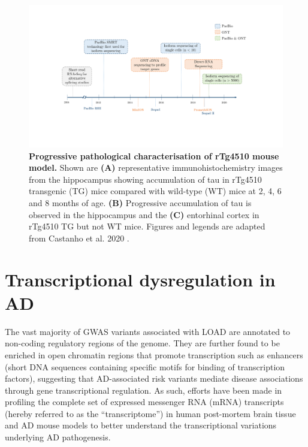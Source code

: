 \begin{landscape}
	\begin{figure}[htp]
		\centering
		\vspace{20pt}
		\includegraphics[page=3,trim={0 7cm 0 0 },clip, scale = 0.7]{Figures/Introduction_Figures_Landscape.pdf}
		\captionsetup{width=1.5\textwidth}
		\caption[Progressive pathological characterisation of rTg4510 mouse model]%
		{\textbf{Progressive pathological characterisation of rTg4510 mouse model.} Shown are \textbf{(A)} representative immunohistochemistry images from the hippocampus showing accumulation of tau in rTg4510 transgenic (TG) mice compared with wild-type (WT) mice at 2, 4, 6 and 8 months of age. \textbf{(B)} Progressive accumulation of tau is observed in the hippocampus and the \textbf{(C)} entorhinal cortex in rTg4510 TG but not WT mice. Figures and legends are adapted from Castanho et al. 2020 \cite{Castanho2020}.}
		\label{fig:immunohistochemistry}
	\end{figure}	
\end{landscape}

\clearpage
\section{Transcriptional dysregulation in AD}

The vast majority of GWAS variants associated with LOAD are annotated to non-coding regulatory regions of the genome\cite{Kunkle2019,Lambert2013}. They are further found to be enriched in open chromatin regions that promote transcription such as enhancers\cite{Kikuchi2019} (short DNA sequences containing specific motifs for binding of transcription factors), suggesting that AD-associated risk variants mediate disease associations through gene transcriptional regulation. As such, efforts have been made in profiling the complete set of expressed messenger RNA (mRNA) transcripts (hereby referred to as the “transcriptome”) in human post-mortem brain tissue and AD mouse models to better understand the transcriptional variations underlying AD pathogenesis. 

